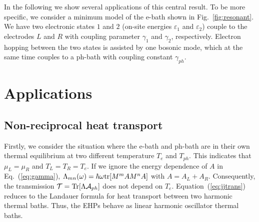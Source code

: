 \documentclass[aps,prb,
,floatfix,footinbib,shortbibliography,
preprint
]{revtex4-1}
\begin{document}
In the following we show several applications of this central result.
To be more specific, we consider a minimum model of the e-bath shown in Fig.~\ref{fig:resonant}. We have two electronic states $1$ and $2$ (on-site energies $\varepsilon_1$ and $\varepsilon_2$) couple to the electrodes $L$ and $R$ with coupling parameter $\gamma_1$ and $\gamma_2$, respectively. 
Electron hopping between the two states is assisted by one bosonic mode, which at the same time couples to a ph-bath with coupling constant $\gamma_{ph}$.

\section{Applications}
\subsection{Non-reciprocal heat transport}
Firstly, we consider the situation where the e-bath and ph-bath are in their own thermal equilibrium at two different temperature $T_e$ and $T_{ph}$. This indicates that  $\mu_{L}=\mu_{R}$ and $T_{L}=T_R=T_e$. 
If we ignore the energy dependence of $A$ in Eq.~(\ref{eq:gamma}),
$\Lambda_{mn}(\omega)=\hbar\omega{\rm tr}[M^m A M^n A]$
with $A=A_L+A_R$. Consequently,  the transmission $\mathcal{T}={\rm Tr}[\Lambda\mathcal{A}_{ph}]$ does not depend on $T_e$. Equation~(\ref{eq:jjtrans}) reduces to the Landauer formula for heat transport between two harmonic thermal baths. Thus, the EHPs behave as linear harmonic oscillator thermal baths. 
\end{document}
